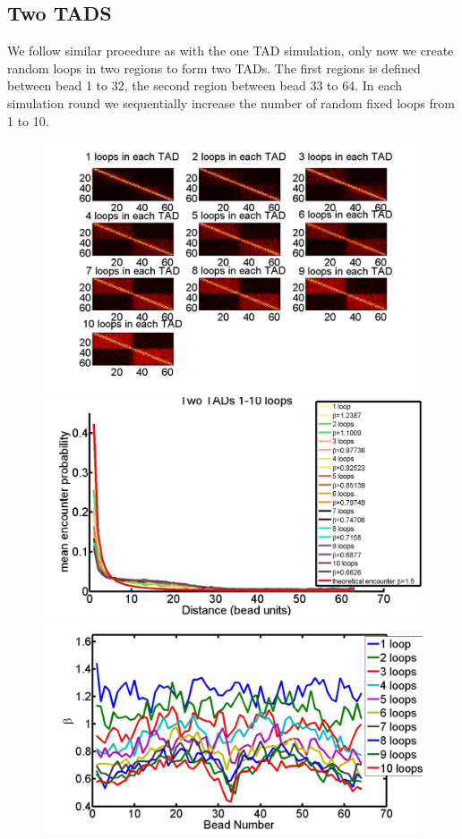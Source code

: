 \documentclass[12pt]{paper}
\begin{document}
\subsection{Two TADS}
We follow similar procedure as with the one TAD simulation, only now we create random loops in two regions to form two TADs. The first regions is defined between bead 1 to 32, the second region between bead 33 to 64. In each simulation round we sequentially increase the number of random fixed loops from 1 to 10. 

\begin{figure}[H]
\centering
\includegraphics[scale=0.25]{encounterHistogram1To10LoopsInEachTAD}
\includegraphics[scale=0.1]{meanEncounterProbabilityTwoTADs}
\includegraphics[scale=0.1]{fittedExpTwoTADs1To10Loops}

\end{figure}
\end{document}
